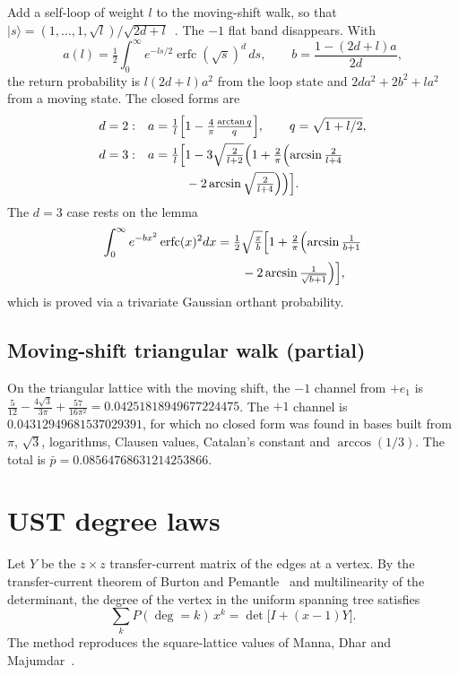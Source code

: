\documentclass[aps,pra,10pt,twocolumn,superscriptaddress,nofootinbib]{revtex4-2}
\newcommand{\pbar}{\bar{p}}
\newcommand{\erfc}{\operatorname{erfc}}
\newcommand{\sq}{\sqrt{3}}
\begin{document}
Add a self-loop of weight $l$ to the moving-shift walk, so that
$|s\rangle=(1,\dots,1,\sqrt l)/\sqrt{2d+l}$~\cite{Wong2015}. The $-1$ flat band disappears. With
\begin{equation}
a(l)=\tfrac12\int_0^\infty e^{-ls/2}\erfc(\sqrt s)^d\,ds,\qquad b=\frac{1-(2d+l)a}{2d},
\end{equation}
the return probability is $l(2d+l)a^2$ from the loop state and $2da^2+2b^2+la^2$ from a moving
state. The closed forms are
\begin{align}
d=2:&\quad a=\tfrac1l\Bigl[1-\tfrac4\pi\tfrac{\arctan q}{q}\Bigr],\qquad q=\sqrt{1+l/2},\\
d=3:&\quad a=\tfrac1l\Bigl[1-3\sqrt{\tfrac{2}{l+2}}\Bigl(1+\tfrac2\pi\Bigl(\arcsin\tfrac2{l+4}\nonumber\\
&\qquad\qquad-2\arcsin\sqrt{\tfrac2{l+4}}\Bigr)\Bigr)\Bigr].
\end{align}
The $d=3$ case rests on the lemma
\begin{align}
\int_0^\infty e^{-bx^2}\erfc(x)^2dx
&=\tfrac12\sqrt{\tfrac\pi b}\Bigl[1+\tfrac2\pi\Bigl(\arcsin\tfrac1{b+1}\nonumber\\
&\qquad-2\arcsin\tfrac1{\sqrt{b+1}}\Bigr)\Bigr],
\end{align}
which is proved via a trivariate Gaussian orthant probability.

\subsection{Moving-shift triangular walk (partial)}

On the triangular lattice with the moving shift, the $-1$ channel from $+e_1$ is
$\tfrac5{12}-\tfrac{4\sq}{3\pi}+\tfrac{57}{16\pi^2}=0.04251818949677224475$. The $+1$ channel is
$0.04312949681537029391$, for which no closed form was found in bases built from
$\pi$, $\sq$, logarithms, Clausen values, Catalan's constant and $\arccos(1/3)$. The total is
$\pbar=0.08564768631214253866$.

\section{UST degree laws}
\label{sec:ust}

Let $Y$ be the $z\times z$ transfer-current matrix of the edges at a vertex. By the transfer-current
theorem of Burton and Pemantle~\cite{BurtonPemantle1993} and multilinearity of the determinant,
the degree of the vertex in the uniform spanning tree satisfies
\begin{equation}
\sum_kP(\deg=k)\,x^k=\det\bigl[I+(x-1)Y\bigr].
\label{eq:ust-gf}
\end{equation}
The method reproduces the square-lattice values of Manna, Dhar and Majumdar~\cite{Manna1992}.
\end{document}
